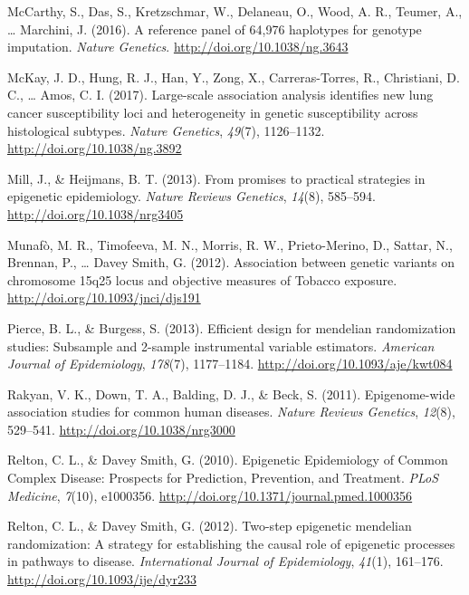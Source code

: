 \documentclass[11pt,twoside]{bristolthesis}
\newlength{\cslhangindent}
\newenvironment{cslreferences}%
  {\setlength{\parindent}{0pt}%
  \everypar{\setlength{\hangindent}{\cslhangindent}}\ignorespaces}%
  {\par}
\begin{document}
\begin{cslreferences}
\leavevmode\hypertarget{ref-McCarthy2016}{}%
McCarthy, S., Das, S., Kretzschmar, W., Delaneau, O., Wood, A. R., Teumer, A., \ldots{} Marchini, J. (2016). A reference panel of 64,976 haplotypes for genotype imputation. \emph{Nature Genetics}. \url{http://doi.org/10.1038/ng.3643}

\leavevmode\hypertarget{ref-McKay2017}{}%
McKay, J. D., Hung, R. J., Han, Y., Zong, X., Carreras-Torres, R., Christiani, D. C., \ldots{} Amos, C. I. (2017). Large-scale association analysis identifies new lung cancer susceptibility loci and heterogeneity in genetic susceptibility across histological subtypes. \emph{Nature Genetics}, \emph{49}(7), 1126--1132. \url{http://doi.org/10.1038/ng.3892}

\leavevmode\hypertarget{ref-Mill2013}{}%
Mill, J., \& Heijmans, B. T. (2013). From promises to practical strategies in epigenetic epidemiology. \emph{Nature Reviews Genetics}, \emph{14}(8), 585--594. \url{http://doi.org/10.1038/nrg3405}

\leavevmode\hypertarget{ref-Munafo2012}{}%
Munafò, M. R., Timofeeva, M. N., Morris, R. W., Prieto-Merino, D., Sattar, N., Brennan, P., \ldots{} Davey Smith, G. (2012). Association between genetic variants on chromosome 15q25 locus and objective measures of Tobacco exposure. \url{http://doi.org/10.1093/jnci/djs191}

\leavevmode\hypertarget{ref-Pierce2013}{}%
Pierce, B. L., \& Burgess, S. (2013). Efficient design for mendelian randomization studies: Subsample and 2-sample instrumental variable estimators. \emph{American Journal of Epidemiology}, \emph{178}(7), 1177--1184. \url{http://doi.org/10.1093/aje/kwt084}

\leavevmode\hypertarget{ref-Rakyan2011}{}%
Rakyan, V. K., Down, T. A., Balding, D. J., \& Beck, S. (2011). Epigenome-wide association studies for common human diseases. \emph{Nature Reviews Genetics}, \emph{12}(8), 529--541. \url{http://doi.org/10.1038/nrg3000}

\leavevmode\hypertarget{ref-Relton2010}{}%
Relton, C. L., \& Davey Smith, G. (2010). Epigenetic Epidemiology of Common Complex Disease: Prospects for Prediction, Prevention, and Treatment. \emph{PLoS Medicine}, \emph{7}(10), e1000356. \url{http://doi.org/10.1371/journal.pmed.1000356}

\leavevmode\hypertarget{ref-Relton2012}{}%
Relton, C. L., \& Davey Smith, G. (2012). Two-step epigenetic mendelian randomization: A strategy for establishing the causal role of epigenetic processes in pathways to disease. \emph{International Journal of Epidemiology}, \emph{41}(1), 161--176. \url{http://doi.org/10.1093/ije/dyr233}


\end{cslreferences}
\end{document}

